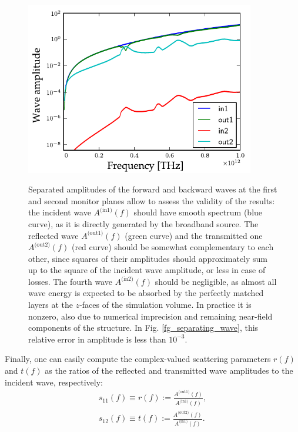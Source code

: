 \begin{figure}[ht] \caption{Separated amplitudes of the forward and backward waves at the first and second monitor planes 
allow to assess the validity of the results: the incident wave $A^{\text{(in1)}}(f)$ should have smooth spectrum (blue curve), as it is directly generated by the broadband source. The reflected wave $A^{\text{(out1)}}(f)$ (green curve) and the transmitted one $A^{\text{(out2)}}(f)$ (red curve) should be somewhat complementary to each other, since squares of their amplitudes should approximately sum up to the square of the incident wave amplitude, or less in case of losses. The fourth wave $A^{\text{(in2)}}(f)$ should be negligible, as almost all wave energy is expected to be absorbed by the perfectly matched layers at the $z$-faces of the simulation volume. In practice it is nonzero, also due to numerical imprecision and remaining near-field components of the structure. In Fig. \ref{fg_separating_wave}, this relative error in amplitude is less than $10^{-3}$.}  \centering \includegraphics[width=10cm]{img/sim_ampli_debug_band.pdf}\label{fg_ampli} \end{figure} 

Finally, one can easily compute the complex-valued scattering parameters $r(f)$ and $t(f)$ as the ratios of the reflected and transmitted wave amplitudes to the incident wave, respectively:
\begin{equation} 
	\begin{split}
		s_{11}(f) \equiv r(f) := \frac{A^{\text{(out1)}}(f)}{A^{\text{(in1)}}(f)},\\
		s_{12}(f) \equiv t(f) := \frac{A^{\text{(out2)}}(f)}{A^{\text{(in1)}}(f)}.
	\end{split}
\label{eq_sparam}\end{equation}

